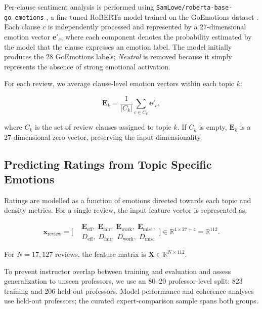 \documentclass[fleqn,10pt]{JLA_article}
\let\cite\shortcite
\begin{document}
Per-clause sentiment analysis is performed using \texttt{SamLowe/roberta-base-go\_emotions} \cite{sam_lowe_2024}, a fine-tuned RoBERTa model trained on the GoEmotions dataset \cite{Demszky2020}. Each clause $c$ is independently processed and represented by a 27-dimensional emotion vector $\mathbf{e}'_c$, where each component denotes the probability estimated by the model that the clause expresses an emotion label. The model initially produces the 28 GoEmotions labels; \textit{Neutral} is removed because it simply represents the absence of strong emotional activation.

  For each review, we average clause-level emotion vectors within each topic $k$:

\begin{equation}
\mathbf{E}_k = \frac{1}{|C_k|} \sum_{c \in C_k} \mathbf{e}'_c,
\end{equation}

where $C_k$ is the set of review clauses assigned to topic $k$. If $C_k$ is empty, $\mathbf{E}_k$ is a 27-dimensional zero vector, preserving the input dimensionality.

\subsection{Predicting Ratings from Topic Specific Emotions}

Ratings are modelled as a function of emotions directed towards each topic and density metrics. For a single review, the input feature vector is represented as:

\begin{equation}
\mathbf{x}_{\text{review}} =
\Big[
\begin{aligned}
&\mathbf{E}_{\text{eff}}, \;\mathbf{E}_{\text{fair}}, \;\mathbf{E}_{\text{work}}, \;\mathbf{E}_{\text{misc}},\\
& D_{\text{eff}}, \; D_{\text{fair}}, \; D_{\text{work}}, \; D_{\text{misc}}
\end{aligned}
\Big]
\in \mathbb{R}^{4 \times 27 + 4} = \mathbb{R}^{112}.
\end{equation}

For $N=17{,}127$ reviews, the feature matrix is $\mathbf{X} \in \mathbb{R}^{N \times 112}$.

To prevent instructor overlap between training and evaluation and assess generalization to unseen professors, we use an 80--20 professor-level split: 823 training and 206 held-out professors. Model-performance and coherence analyses use held-out professors; the curated expert-comparison sample spans both groups.
\end{document}

